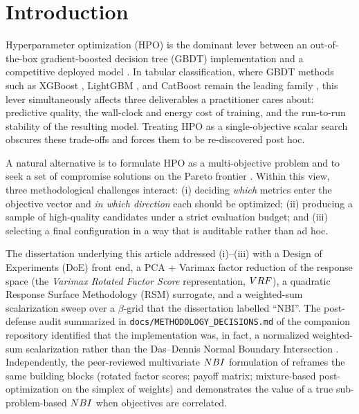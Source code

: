 \section{Introduction}\label{sec:introduction}

Hyperparameter optimization (HPO) is the dominant lever between an
out-of-the-box gradient-boosted decision tree (GBDT) implementation
and a competitive deployed model
\citep{probst2019tunability,bergstra2012random}. In tabular
classification, where GBDT methods such as XGBoost
\citep{chen2016xgboost}, LightGBM \citep{ke2017lightgbm}, and CatBoost
\citep{prokhorenkova2018catboost} remain the leading family
\citep{grinsztajn2022tree}, this lever simultaneously affects three
deliverables a practitioner cares about: predictive quality, the
wall-clock and energy cost of training, and the run-to-run stability
of the resulting model. Treating HPO as a single-objective scalar
search obscures these trade-offs and forces them to be re-discovered
post hoc.

A natural alternative is to formulate HPO as a multi-objective problem
and to seek a set of compromise solutions on the Pareto frontier
\citep{deb2002nsga2,morales2022survey}. Within this view, three
methodological challenges interact: (i) deciding \emph{which}
metrics enter the objective vector and \emph{in which direction} each
should be optimized; (ii) producing a sample of high-quality candidates
under a strict evaluation budget; and (iii) selecting a final
configuration in a way that is auditable rather than ad hoc.

The dissertation underlying this article \citep{ribeiro2026dissertation}
addressed (i)--(iii) with a Design of Experiments (DoE) front end, a
PCA + Varimax factor reduction of the response space (the
\emph{Varimax Rotated Factor Score} representation, $VRF$), a
quadratic Response Surface Methodology (RSM) surrogate, and a
weighted-sum scalarization sweep over a $\beta$-grid that the
dissertation labelled ``NBI''. The post-defense audit summarized in
\texttt{docs/METHODOLOGY\_DECISIONS.md} of the companion repository
identified that the implementation was, in fact, a normalized
weighted-sum scalarization rather than the Das--Dennis Normal Boundary
Intersection \citep{das1998nbi}. Independently, the peer-reviewed
multivariate $NBI$ formulation of \citet{pereira2025eaai} reframes
the same building blocks (rotated factor scores; payoff matrix;
mixture-based post-optimization on the simplex of weights) and
demonstrates the value of a true sub-problem-based $NBI$ when
objectives are correlated.

